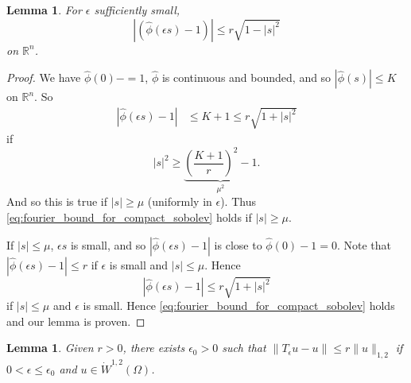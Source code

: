 \documentclass[10pt, oneside, reqno]{amsart}
\theoremstyle{plain}%
\newtheorem{lem}[thm]{Lemma}
\numberwithin{equation}{section}
\theoremstyle{definition}
\theoremstyle{remark}
\newcommand{\R}{\mathbb{R}}
\begin{document}
\begin{lem}
	\label{thm:fourier_bound_for_compact_sobolev}
	For $\epsilon$ sufficiently small, \begin{equation}
		\label{eq:fourier_bound_for_compact_sobolev}
		\left| \left( \hat \phi(\epsilon s) - 1 \right) \right| \leq r \sqrt{1 - |s|^2}
	\end{equation}
	on $\R^n$. 
\end{lem}
\begin{proof}
	We have $\hat \phi(0) -= 1$, $\hat \phi$ is continuous and bounded, and so $\left|\hat \phi(s) \right| \leq K$ on $\R^n$.  
	So \begin{align*}
		\left| \hat \phi(\epsilon s) - 1 \right| &\leq K + 1 \leq r\sqrt{1 + |s|^2}
	\end{align*} if \[
		|s|^2 \geq \underbrace{\left( \frac{K+1}{r} \right)^2 - 1}_{\mu^2}.
		\]  And so this is true if $|s| \geq \mu$ (uniformly in $\epsilon$).  Thus \eqref{eq:fourier_bound_for_compact_sobolev} holds if $|s| \geq \mu$.
	 
	If $|s| \leq \mu$, $\epsilon s$ is small, and so $\left|\hat \phi(\epsilon s) - 1 \right|$ is close to $\hat \phi(0) - 1 = 0$.  Note that $\left| \hat \phi(\epsilon s) - 1 \right| \leq r$ if $\epsilon$ is small and $|s| \leq \mu$.  Hence \[
		\left| \hat \phi(\epsilon s) - 1 \right| \leq r \sqrt{1 + |s|^2}
	\]  if $|s| \leq \mu$ and $\epsilon$ is small.  Hence \eqref{eq:fourier_bound_for_compact_sobolev} holds and our lemma is proven.
\end{proof}


\newcommand{\interior}{\textsc{Int\ }}

\begin{lem}
	\label{lem:bound_on_continuity_of_convolution}
	Given $r > 0$, there exists $\epsilon_0 > 0$ such that $\| T_\epsilon u - u \| \leq r \| u \|_{1, 2}$ if $0 < \epsilon \leq \epsilon_0$ and $u \in \dot W^{1, 2}(\Omega)$.
\end{lem}
\end{document}
